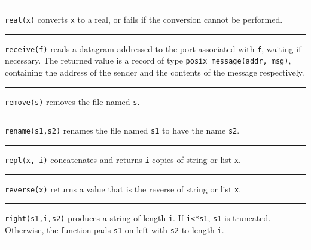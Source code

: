 \bigskip\hrule\vspace{0.1cm}

\noindent
{}\texttt{real(x)} converts \texttt{x} to a real,
or fails if the conversion cannot be performed.

\bigskip\hrule\vspace{0.1cm}

\noindent
{}\texttt{receive(f)} reads a datagram addressed
to the port associated with \texttt{f}, waiting if necessary. The
returned value is a record of type \texttt{posix\_message(addr, msg)},
containing the address of the sender and the contents of the message
respectively. 

\bigskip\hrule\vspace{0.1cm}

\noindent
{}\texttt{remove(s)} removes the
file named \texttt{s}.

\bigskip\hrule\vspace{0.1cm}

\noindent
{}\texttt{rename(s1,s2)} renames the file named
\texttt{s1} to have the name \texttt{s2}.

\bigskip\hrule\vspace{0.1cm}

\noindent
{}\texttt{repl(x, i)} concatenates and returns
\texttt{i} copies of string or list \texttt{x}.

\bigskip\hrule\vspace{0.1cm}

\noindent
{}\texttt{reverse(x)} returns a value that is the
reverse of string or list \texttt{x}.

\bigskip\hrule\vspace{0.1cm}

\noindent
{}\texttt{right(s1,i,s2)} produces a string of length
\texttt{i}. If \texttt{i{\textless}*s1}, \texttt{s1} is truncated.
Otherwise, the function pads \texttt{s1} on left with \texttt{s2} to
length \texttt{i}.

\bigskip\hrule\vspace{0.1cm}

